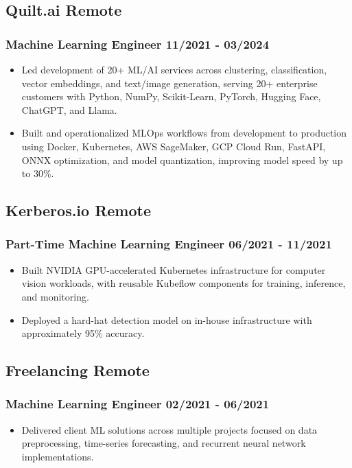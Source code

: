 \documentclass[11pt]{article} %
\begin{document}
\subsection{Quilt.ai \hfill Remote}
\subsubsection{Machine Learning Engineer \hfill 11/2021 - 03/2024}
\begin{itemize}
	\item Led development of 20+ ML/AI services across clustering, classification, vector embeddings, and text/image generation, serving 20+ enterprise customers with Python, NumPy, Scikit-Learn, PyTorch, Hugging Face, ChatGPT, and Llama.
	\item Built and operationalized MLOps workflows from development to production using Docker, Kubernetes, AWS SageMaker, GCP Cloud Run, FastAPI, ONNX optimization, and model quantization, improving model speed by up to 30\%.
\end{itemize}

\subsection{Kerberos.io \hfill Remote}
\subsubsection{Part-Time Machine Learning Engineer \hfill 06/2021 - 11/2021}
\begin{itemize}
	\item Built NVIDIA GPU-accelerated Kubernetes infrastructure for computer vision workloads, with reusable Kubeflow components for training, inference, and monitoring.
	\item Deployed a hard-hat detection model on in-house infrastructure with approximately 95\% accuracy.
\end{itemize}

\subsection{Freelancing \hfill Remote}
\subsubsection{Machine Learning Engineer \hfill 02/2021 - 06/2021}
\begin{itemize}
	\item Delivered client ML solutions across multiple projects focused on data preprocessing, time-series forecasting, and recurrent neural network implementations.
\end{itemize}
\end{document}
